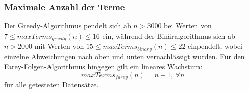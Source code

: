 

\subsubsection{Maximale Anzahl der Terme}
 Der Greedy-Algorithmus pendelt sich ab $n>3000$ bei Werten von $7 \leq maxTerms_{greedy}(n) \leq 16$ ein, während der Binäralgorithmus sich ab $n>2000$ mit Werten von $15 \leq maxTerms_{binary}(n) \leq 22$ einpendelt, wobei einzelne Abweichungen nach oben und unten vernachlässigt wurden. Für den Farey-Folgen-Algorithmus hingegen gilt ein lineares Wachstum:
$$maxTerms_{farey}(n) = n + 1, \, \forall n$$
für alle getesteten Datensätze. 


